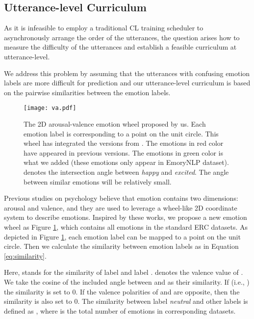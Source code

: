 \documentclass[letterpaper]{article} \usepackage{aaai22}  \usepackage{times}  \usepackage{helvet}  \usepackage{courier}  \usepackage[hyphens]{url}  \usepackage{graphicx} \urlstyle{rm} \def\UrlFont{\rm}  \usepackage{natbib}  \usepackage{caption} \DeclareCaptionStyle{ruled}{labelfont=normalfont,labelsep=colon,strut=off} \frenchspacing  \setlength{\pdfpagewidth}{8.5in}  \setlength{\pdfpageheight}{11in}
\begin{document}
\subsection{Utterance-level Curriculum }

As it is infeasible to employ a traditional  CL training scheduler  to asynchronously arrange the order of the utterances, the question arises how to measure the difficulty of the utterances and establish a feasible curriculum at utterance-level. 

We address this problem by assuming that the utterances with confusing emotion labels are more difficult for prediction and our utterance-level curriculum is based on the pairwise similarities between the emotion labels. 


\begin{figure}[htbp]  	
	\centering  
	\texttt{[image: va.pdf]}
	\caption{The 2D arousal-valence emotion wheel proposed by us. Each emotion label is corresponding to a point on the unit circle. This wheel has integrated the versions from \cite{jing2019automatic,yang2021circular,toisoul2021estimation}. The emotions in red color have appeared in previous versions. The emotions in green color is what we added (these emotions only appear in EmoryNLP dataset).  denotes the intersection angle between \emph{happy} and \emph{excited}. The angle between similar emotions will be relatively small.  }  
	\label{fig:emotion_va}  	
\end{figure}


Previous studies  \cite{plutchik1982psychoevolutionary,mikels2005emotional,russell1980circumplex} on psychology believe that emotion contains two dimensions: arousal and valence, and they are used to leverage a wheel-like 2D coordinate system to describe emotions. Inspired by these works, we propose a new emotion wheel as Figure \ref{fig:emotion_va}, which contains all emotions in the standard ERC datasets. As depicted in Figure \ref{fig:emotion_va}, each emotion label can be mapped to a point on the unit circle. Then we calculate the similarity between emotion labels as in Equation \ref{eq:similarity}. 





Here,  stands for the similarity of label  and label .  denotes the valence value of . We take the cosine of the included angle  between   and   as their similarity. If  (i.e., ) the similarity is set to 0. If the valence polarities of  and  are opposite, then the similarity is also set to 0.  The similarity between label \emph{neutral} and other labels is defined as , where  is the total number of emotions in corresponding datasets.
\end{document}
